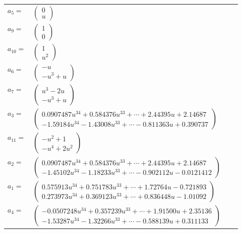 \documentclass[1p]{elsarticle_modified}
\theoremstyle{definition}
\begin{document}
\begin{tabular}{m{7pt} m{180pt} m{7pt} m{180pt} }
\flushright $a_{5}=$&$\begin{pmatrix}0\\u\end{pmatrix}$ \\
\flushright $a_{9}=$&$\begin{pmatrix}1\\0\end{pmatrix}$ \\
\flushright $a_{10}=$&$\begin{pmatrix}1\\u^2\end{pmatrix}$ \\
\flushright $a_{6}=$&$\begin{pmatrix}- u\\- u^3+u\end{pmatrix}$ \\
\flushright $a_{7}=$&$\begin{pmatrix}u^3-2 u\\- u^3+u\end{pmatrix}$ \\
\flushright $a_{3}=$&$\begin{pmatrix}0.0907487 u^{34}+0.584376 u^{33}+\cdots+2.44395 u+2.14687\\-1.59184 u^{34}-1.43008 u^{33}+\cdots-0.811363 u+0.390737\end{pmatrix}$ \\
\flushright $a_{11}=$&$\begin{pmatrix}- u^2+1\\- u^4+2 u^2\end{pmatrix}$ \\
\flushright $a_{2}=$&$\begin{pmatrix}0.0907487 u^{34}+0.584376 u^{33}+\cdots+2.44395 u+2.14687\\-1.45102 u^{34}-1.18233 u^{33}+\cdots-0.902112 u-0.0121412\end{pmatrix}$ \\
\flushright $a_{1}=$&$\begin{pmatrix}0.575913 u^{34}+0.751783 u^{33}+\cdots+1.72764 u-0.721893\\0.273973 u^{34}+0.369123 u^{33}+\cdots+0.836448 u-1.01092\end{pmatrix}$ \\
\flushright $a_{4}=$&$\begin{pmatrix}-0.0507248 u^{34}+0.357239 u^{33}+\cdots+1.91500 u+2.35136\\-1.53287 u^{34}-1.32266 u^{33}+\cdots-0.588139 u+0.311133\end{pmatrix}$ \\

\end{tabular}
\end{document}
